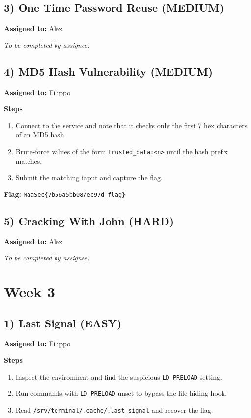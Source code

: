 \documentclass[10pt,a4paper]{article}
\begin{document}
\subsection*{3) One Time Password Reuse (MEDIUM)}
\textbf{Assigned to:} Alex

\textit{To be completed by assignee.}

\subsection*{4) MD5 Hash Vulnerability (MEDIUM)}
\textbf{Assigned to:} Filippo

\textbf{Steps}
\begin{enumerate}[leftmargin=*,noitemsep]
  \item Connect to the service and note that it checks only the first 7 hex characters of an MD5 hash.
  \item Brute-force values of the form \texttt{trusted\_data:<n>} until the hash prefix matches.
  \item Submit the matching input and capture the flag.
\end{enumerate}

\textbf{Flag:} \texttt{MaaSec\{7b56a5bb087ec97d\_flag\}}


\subsection*{5) Cracking With John (HARD)}
\textbf{Assigned to:} Alex

\textit{To be completed by assignee.}

\section{Week 3}

\subsection*{1) Last Signal (EASY)}
\textbf{Assigned to:} Filippo

\textbf{Steps}
\begin{enumerate}[leftmargin=*,noitemsep]
  \item Inspect the environment and find the suspicious \texttt{LD\_PRELOAD} setting.
  \item Run commands with \texttt{LD\_PRELOAD} unset to bypass the file-hiding hook.
  \item Read \texttt{/srv/terminal/.cache/.last\_signal} and recover the flag.
\end{enumerate}
\end{document}
